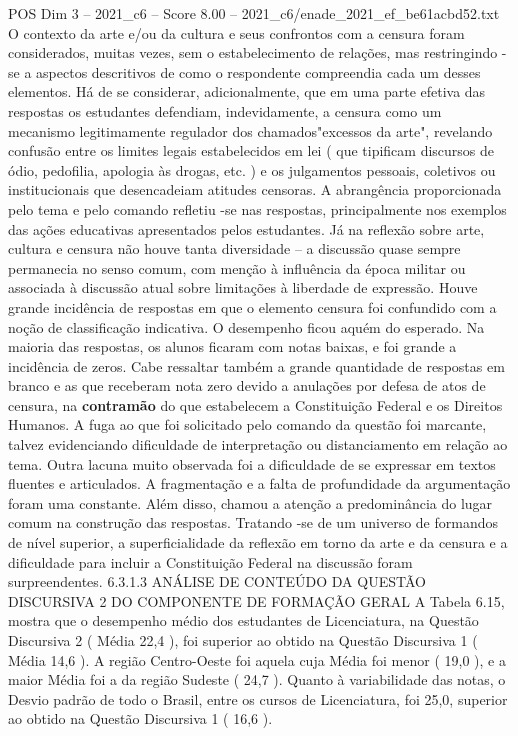 \begin{textsample}{POS Dim 3 – 2021\_c6 – Score 8.00 – 2021\_c6/enade\_2021\_ef\_be61acbd52.txt}
O contexto da arte e/ou da cultura e seus confrontos com a censura foram considerados, muitas vezes, sem o estabelecimento de relações, mas restringindo -se a aspectos descritivos de como o respondente compreendia cada um desses elementos.
Há de se considerar, adicionalmente, que em uma parte efetiva das respostas os estudantes defendiam, indevidamente, a censura como um mecanismo legitimamente regulador dos chamados"excessos da arte", revelando confusão entre os limites legais estabelecidos em lei ( que tipificam discursos de ódio, pedofilia, apologia às drogas, etc. ) e os julgamentos pessoais, coletivos ou institucionais que desencadeiam atitudes censoras.
A abrangência proporcionada pelo tema e pelo comando refletiu -se nas respostas, principalmente nos exemplos das ações educativas apresentados pelos estudantes.
Já na reflexão sobre arte, cultura e censura não houve tanta diversidade – a discussão quase sempre permanecia no senso comum, com menção à influência da época militar ou associada à discussão atual sobre limitações à liberdade de expressão.
Houve grande incidência de respostas em que o elemento censura foi confundido com a noção de classificação indicativa.
O desempenho ficou aquém do esperado.
Na maioria das respostas, os alunos ficaram com notas baixas, e foi grande a incidência de zeros.
Cabe ressaltar também a grande quantidade de respostas em branco e as que receberam nota zero devido a anulações por defesa de atos de censura, na \textbf{contramão} do que estabelecem a Constituição Federal e os Direitos Humanos.
A fuga ao que foi solicitado pelo comando da questão foi marcante, talvez evidenciando dificuldade de interpretação ou distanciamento em relação ao tema.
Outra lacuna muito observada foi a dificuldade de se expressar em textos fluentes e articulados.
A fragmentação e a falta de profundidade da argumentação foram uma constante.
Além disso, chamou a atenção a predominância do lugar comum na construção das respostas.
Tratando -se de um universo de formandos de nível superior, a superficialidade da reflexão em torno da arte e da censura e a dificuldade para incluir a Constituição Federal na discussão foram surpreendentes. 6.3.1.3 ANÁLISE DE CONTEÚDO DA QUESTÃO DISCURSIVA 2 DO COMPONENTE DE FORMAÇÃO GERAL A Tabela 6.15, mostra que o desempenho médio dos estudantes de Licenciatura, na Questão Discursiva 2 ( Média 22,4 ), foi superior ao obtido na Questão Discursiva 1 ( Média 14,6 ).
A região Centro-Oeste foi aquela cuja Média foi menor ( 19,0 ), e a maior Média foi a da região Sudeste ( 24,7 ).
Quanto à variabilidade das notas, o Desvio padrão de todo o Brasil, entre os cursos de Licenciatura, foi 25,0, superior ao obtido na Questão Discursiva 1 ( 16,6 ).

\end{textsample}

